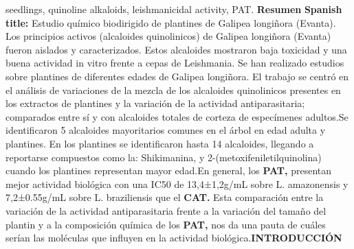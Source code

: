 \documentclass{article}
\begin{document}
{seedlings, quinoline alkaloids, leishmanicidal activity, PAT. }{\textbf{Resumen}
}{\textbf{Spanish title: }
Estudio químico biodirigido de plantines de Galipea longiñora (Evanta). Los principios activos (alcaloides quinolinicos) de Galipea longiñora (Evanta) fueron aislados y caracterizados. Estos alcaloides mostraron baja toxicidad y una buena actividad in vitro frente a cepas de Leishmania. Se han realizado estudios sobre plantines de diferentes edades de Galipea longiñora. El trabajo se centró en el análisis de variaciones de la mezcla de los alcaloides quinolinicos presentes en los extractos de plantines y la variación de la actividad antiparasitaria; comparados entre sí y con alcaloides totales de corteza de especímenes adultos.}{Se identificaron 5 alcaloides mayoritarios comunes en el árbol en edad adulta y plantines. En los plantines se identificaron hasta 14 alcaloides, llegando a reportarse compuestos como la: Shikimanina, y 2-(metoxifeniletilquinolina) cuando los plantines representan mayor edad.}{En general, los \textbf{PAT, }
presentan mejor actividad biológica con una IC50 de 13,4±1,2g/mL sobre L. amazonensis y 7,2±0.55g/mL sobre L. braziliensis que el \textbf{CAT. }
Esta comparación entre la variación de la actividad antiparasitaria frente a la variación del tamaño del plantin y a la composición química de los \textbf{PAT, }
nos da una pauta de cuáles serían las moléculas que influyen en la actividad biológica.}{\textbf{INTRODUCCIÓN}
}
\end{document}
